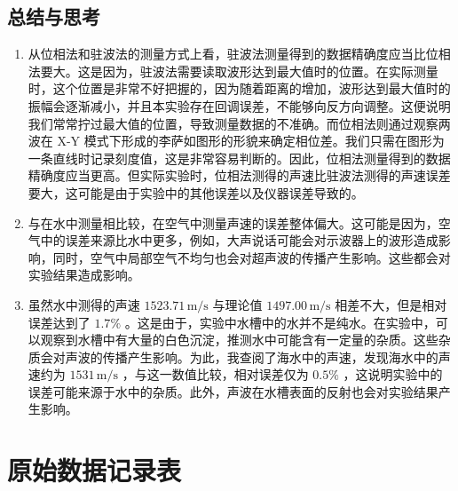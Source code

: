 \documentclass[zihao=5, UTF8]{article}
\theoremstyle{MyLineTheoremStyle} %
\theoremstyle{MyBlockTheoremStyle} %
\theoremstyle{MySubsubsectionStyle} %
\begin{document}
\subsection{总结与思考}

\begin{enumerate}
  \item 从位相法和驻波法的测量方式上看，驻波法测量得到的数据精确度应当比位相法要大。这是因为，驻波法需要读取波形达到最大值时的位置。在实际测量时，这个位置是非常不好把握的，因为随着距离的增加，波形达到最大值时的振幅会逐渐减小，并且本实验存在回调误差，不能够向反方向调整。这便说明我们常常拧过最大值的位置，导致测量数据的不准确。而位相法则通过观察两波在 X-Y 模式下形成的李萨如图形的形貌来确定相位差。我们只需在图形为一条直线时记录刻度值，这是非常容易判断的。因此，位相法测量得到的数据精确度应当更高。但实际实验时，位相法测得的声速比驻波法测得的声速误差要大，这可能是由于实验中的其他误差以及仪器误差导致的。
  \item 与在水中测量相比较，在空气中测量声速的误差整体偏大。这可能是因为，空气中的误差来源比水中更多，例如，大声说话可能会对示波器上的波形造成影响，同时，空气中局部空气不均匀也会对超声波的传播产生影响。这些都会对实验结果造成影响。
  \item 虽然水中测得的声速 $1523.71 \, \text{m/s}$ 与理论值 $1497.00 \, \text{m/s}$ 相差不大，但是相对误差达到了 $1.7\%$ 。这是由于，实验中水槽中的水并不是纯水。在实验中，可以观察到水槽中有大量的白色沉淀，推测水中可能含有一定量的杂质。这些杂质会对声波的传播产生影响。为此，我查阅了海水中的声速，发现海水中的声速约为 $1531 \, \text{m/s}$ ，与这一数值比较，相对误差仅为 $0.5\%$ ，这说明实验中的误差可能来源于水中的杂质。此外，声波在水槽表面的反射也会对实验结果产生影响。
\end{enumerate}

\section{原始数据记录表}

\end{document}
